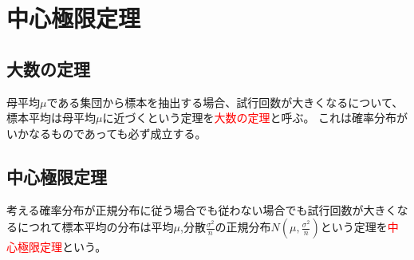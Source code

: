 \documentclass[a4paper,10pt]{jarticle}
\begin{document}
\section{中心極限定理}
\subsection{大数の定理}
母平均$\mu$である集団から標本を抽出する場合、試行回数が大きくなるについて、標本平均は母平均$\mu$に近づくという定理を\textcolor{red}{大数の定理}と呼ぶ。
これは確率分布がいかなるものであっても必ず成立する。
\subsection{中心極限定理}
考える確率分布が正規分布に従う場合でも従わない場合でも試行回数が大きくなるにつれて標本平均の分布は平均$\mu$,分散$\frac{\sigma^2}{n}$の正規分布$N(\mu,\frac{\sigma^2}{n})$という定理を\textcolor{red}{中心極限定理}という。
\end{document}
